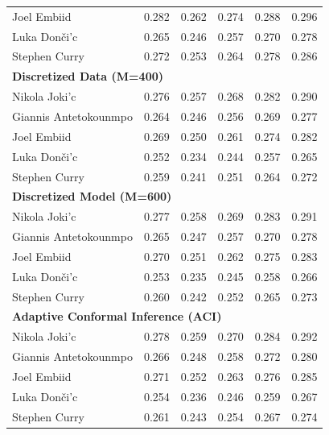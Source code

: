 \documentclass[11pt,a4paper]{article}
\begin{document}
\begin{table}[H]
\begin{tabular}{lccccc}
Joel Embiid & 0.282 & 0.262 & 0.274 & 0.288 & 0.296 \\
Luka Don\v{c}i'{c} & 0.265 & 0.246 & 0.257 & 0.270 & 0.278 \\
Stephen Curry & 0.272 & 0.253 & 0.264 & 0.278 & 0.286 \\
\midrule
\multicolumn{6}{l}{\textbf{Discretized Data (M=400)}} \\
\midrule
Nikola Joki'{c} & 0.276 & 0.257 & 0.268 & 0.282 & 0.290 \\
Giannis Antetokounmpo & 0.264 & 0.246 & 0.256 & 0.269 & 0.277 \\
Joel Embiid & 0.269 & 0.250 & 0.261 & 0.274 & 0.282 \\
Luka Don\v{c}i'{c} & 0.252 & 0.234 & 0.244 & 0.257 & 0.265 \\
Stephen Curry & 0.259 & 0.241 & 0.251 & 0.264 & 0.272 \\
\midrule
\multicolumn{6}{l}{\textbf{Discretized Model (M=600)}} \\
\midrule
Nikola Joki'{c} & 0.277 & 0.258 & 0.269 & 0.283 & 0.291 \\
Giannis Antetokounmpo & 0.265 & 0.247 & 0.257 & 0.270 & 0.278 \\
Joel Embiid & 0.270 & 0.251 & 0.262 & 0.275 & 0.283 \\
Luka Don\v{c}i'{c} & 0.253 & 0.235 & 0.245 & 0.258 & 0.266 \\
Stephen Curry & 0.260 & 0.242 & 0.252 & 0.265 & 0.273 \\
\midrule
\multicolumn{6}{l}{\textbf{Adaptive Conformal Inference (ACI)}} \\
\midrule
Nikola Joki'{c} & 0.278 & 0.259 & 0.270 & 0.284 & 0.292 \\
Giannis Antetokounmpo & 0.266 & 0.248 & 0.258 & 0.272 & 0.280 \\
Joel Embiid & 0.271 & 0.252 & 0.263 & 0.276 & 0.285 \\
Luka Don\v{c}i'{c} & 0.254 & 0.236 & 0.246 & 0.259 & 0.267 \\
Stephen Curry & 0.261 & 0.243 & 0.254 & 0.267 & 0.274 \\
\bottomrule
\end{tabular}
\end{table}
\end{document}

